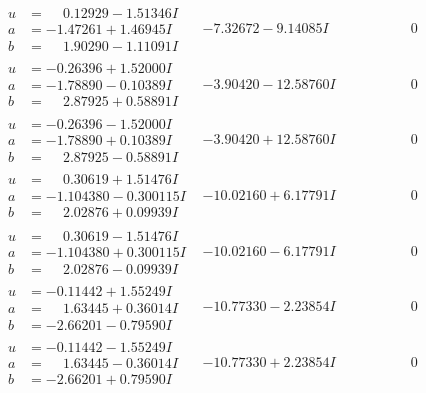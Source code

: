 \documentclass[1p]{elsarticle_modified}
\theoremstyle{definition}
\begin{document}
$$\begin{array}{c|c|c}
\begin{aligned}
u &= \phantom{-}0.12929 - 1.51346 I \\
a &= -1.47261 + 1.46945 I \\
b &= \phantom{-}1.90290 - 1.11091 I\end{aligned}
 & -7.32672 - 9.14085 I & \phantom{-0.000000 } 0 \\ \hline\begin{aligned}
u &= -0.26396 + 1.52000 I \\
a &= -1.78890 - 0.10389 I \\
b &= \phantom{-}2.87925 + 0.58891 I\end{aligned}
 & -3.90420 - 12.58760 I & \phantom{-0.000000 } 0 \\ \hline\begin{aligned}
u &= -0.26396 - 1.52000 I \\
a &= -1.78890 + 0.10389 I \\
b &= \phantom{-}2.87925 - 0.58891 I\end{aligned}
 & -3.90420 + 12.58760 I & \phantom{-0.000000 } 0 \\ \hline\begin{aligned}
u &= \phantom{-}0.30619 + 1.51476 I \\
a &= -1.104380 - 0.300115 I \\
b &= \phantom{-}2.02876 + 0.09939 I\end{aligned}
 & -10.02160 + 6.17791 I & \phantom{-0.000000 } 0 \\ \hline\begin{aligned}
u &= \phantom{-}0.30619 - 1.51476 I \\
a &= -1.104380 + 0.300115 I \\
b &= \phantom{-}2.02876 - 0.09939 I\end{aligned}
 & -10.02160 - 6.17791 I & \phantom{-0.000000 } 0 \\ \hline\begin{aligned}
u &= -0.11442 + 1.55249 I \\
a &= \phantom{-}1.63445 + 0.36014 I \\
b &= -2.66201 - 0.79590 I\end{aligned}
 & -10.77330 - 2.23854 I & \phantom{-0.000000 } 0 \\ \hline\begin{aligned}
u &= -0.11442 - 1.55249 I \\
a &= \phantom{-}1.63445 - 0.36014 I \\
b &= -2.66201 + 0.79590 I\end{aligned}
 & -10.77330 + 2.23854 I & \phantom{-0.000000 } 0\\

\end{array}$$
\end{document}
